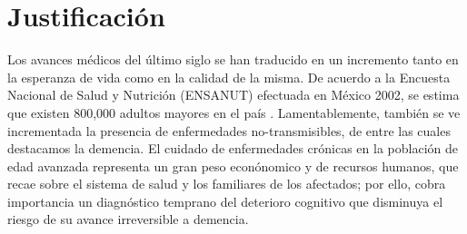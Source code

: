 \documentclass[12pt,a4paper]{mitthesis}
\begin{document}

%
%
%


\section{Justificaci\'on}

Los avances m\'edicos del \'ultimo siglo se han traducido en un incremento tanto en la esperanza de 
vida como en la calidad de la misma. 
De acuerdo a la Encuesta Nacional de Salud y Nutrici\'on (ENSANUT) efectuada en M\'exico 2002, se 
estima que existen 800,000 adultos mayores en el pa\'is \cite{Sosa12}. 
Lamentablemente, tambi\'en se ve incrementada la presencia de enfermedades no-transmisibles, de 
entre las cuales destacamos la demencia.
El cuidado de enfermedades cr\'onicas en la poblaci\'on de edad avanzada representa un gran peso 
econ\'onomico y de recursos humanos, que recae sobre el sistema de salud y los familiares de los 
afectados; por ello, cobra importancia un diagn\'ostico temprano del deterioro cognitivo que 
disminuya el riesgo de su avance irreversible a demencia.
\end{document}
